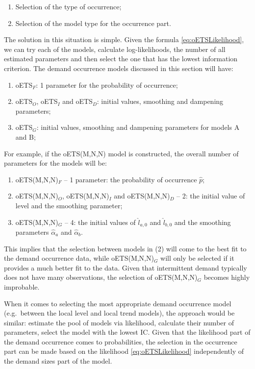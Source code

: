 \documentclass[
]{book}
\providecommand{\tightlist}{%
  \setlength{\itemsep}{0pt}\setlength{\parskip}{0pt}}
\theoremstyle{definition}
\theoremstyle{definition}
\theoremstyle{definition}
\theoremstyle{definition}
\theoremstyle{remark}
\begin{document}
\begin{enumerate}
\def\labelenumi{\arabic{enumi}.}
\tightlist
\item
  Selection of the type of occurrence;
\item
  Selection of the model type for the occurrence part.
\end{enumerate}

The solution in this situation is simple. Given the formula \eqref{eq:oETSLikelihood}, we can try each of the models, calculate log-likelihoods, the number of all estimated parameters and then select the one that has the lowest information criterion. The demand occurrence models discussed in this section will have:

\begin{enumerate}
\def\labelenumi{\arabic{enumi}.}
\tightlist
\item
  oETS\(_F\): 1 parameter for the probability of occurrence;
\item
  oETS\(_O\), oETS\(_I\) and oETS\(_D\): initial values, smoothing and dampening parameters;
\item
  oETS\(_G\): initial values, smoothing and dampening parameters for models A and B;
\end{enumerate}

For example, if the oETS(M,N,N) model is constructed, the overall number of parameters for the models will be:

\begin{enumerate}
\def\labelenumi{\arabic{enumi}.}
\tightlist
\item
  oETS(M,N,N)\(_F\) -- 1 parameter: the probability of occurrence \(\hat{p}\);
\item
  oETS(M,N,N)\(_O\), oETS(M,N,N)\(_I\) and oETS(M,N,N)\(_D\) -- 2: the initial value of level and the smoothing parameter;
\item
  oETS(M,N,N)\(_G\) -- 4: the initial values of \(\hat{l}_{a,0}\) and \(\hat{l}_{b,0}\) and the smoothing parameters \(\hat{\alpha}_a\) and \(\hat{\alpha}_b\).
\end{enumerate}

This implies that the selection between models in (2) will come to the best fit to the demand occurrence data, while oETS(M,N,N)\(_G\) will only be selected if it provides a much better fit to the data. Given that intermittent demand typically does not have many observations, the selection of oETS(M,N,N)\(_G\) becomes highly improbable.

When it comes to selecting the most appropriate demand occurrence model (e.g.~between the local level and local trend models), the approach would be similar: estimate the pool of models via likelihood, calculate their number of parameters, select the model with the lowest IC. Given that the likelihood part of the demand occurrence comes to probabilities, the selection in the occurrence part can be made based on the likelihood \eqref{eq:oETSLikelihood} independently of the demand sizes part of the model.
\end{document}
